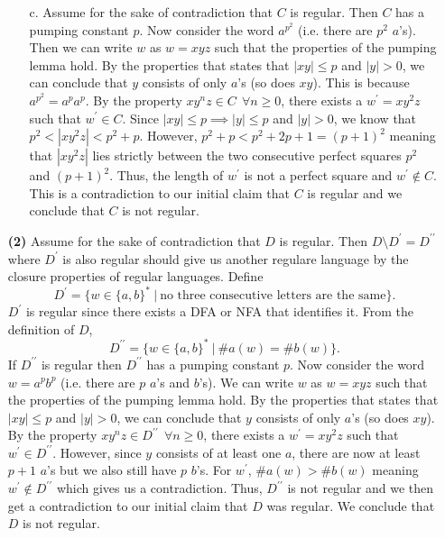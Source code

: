 \documentclass [10pt]{article}
\begin{document}
\begin{enumerate}
\begin{enumerate}
		\item[c.]Assume for the sake of contradiction that $C$ is regular. Then $C$ has a pumping constant $p$. Now consider the word $a^{p^{2}}$ (i.e. there are $p^{2}$ $a$'s). Then we can write $w$ as $w = xyz$ such that the properties of the pumping lemma hold. By the properties that states that $\left|xy\right| \le p$ and $\left|y\right| > 0$, we can conclude that $y$ consists of only $a$'s (so does $xy$). This is because $a^{p^{2}}=a^{p}a^{p}$. By the property $xy^{n}z \in C\:\:\forall n \ge 0$, there exists a $w^{\prime} = xy^{2}z$ such that $w^{\prime} \in C$. Since $\left|xy\right| \le p \implies \left|y\right| \le p$ and $\left|y\right| > 0$, we know that $p^{2} < \left|xy^{2}z\right| < p^{2}+p$. However, $p^{2}+p<p^{2}+2p+1=(p+1)^{2}$ meaning that $\left|xy^{2}z\right|$ lies strictly between the two consecutive perfect squares $p^{2}$ and $(p+1)^{2}$. Thus, the length of $w^{\prime}$ is not a perfect square and $w^{\prime} \notin C$. This is a contradiction to our initial claim that $C$ is regular and we conclude that $C$ is not regular.
	\end{enumerate}
	\item[\textbf{(2)}]Assume for the sake of contradiction that $D$ is regular. Then $D\setminus D^{\prime} = D^{\prime\prime}$ where $D^{\prime}$ is also regular should give us another regulare language by the closure properties of regular languages. Define $$D^{\prime}=\{w\in\{a,b\}^{*}\:|\:\text{no three consecutive letters are the same}\}.$$$D^{\prime}$ is regular since there exists a DFA or NFA that identifies it. From the definition of $D$,$$D^{\prime\prime}=\{w\in\{a,b\}^{*}\:|\:\#a(w)=\#b(w)\}.$$ If $D^{\prime\prime}$ is regular then $D^{\prime\prime}$ has a pumping constant $p$. Now consider the word $w=a^{p}b^{p}$ (i.e. there are $p$ $a$'s and $b$'s). We can write $w$ as $w=xyz$ such that the properties of the pumping lemma hold. By the properties that states that $\left|xy\right| \le p$ and $\left|y\right| > 0$, we can conclude that $y$ consists of only $a$'s (so does $xy$). By the property $xy^{n}z \in D^{\prime\prime}\:\:\forall n \ge 0$, there exists a $w^{\prime} = xy^{2}z$ such that $w^{\prime} \in D^{\prime\prime}$. However, since $y$ consists of at least one $a$, there are now at least $p + 1$ $a$'s but we also still have $p$ $b$'s. For $w^{\prime}$, $\#a(w)>\#b(w)$ meaning $w^{\prime} \notin D^{\prime\prime}$ which gives us a contradiction. Thus, $D^{\prime\prime}$ is not regular and we then get a contradiction to our initial claim that $D$ was regular. We conclude that $D$ is not regular.

\end{enumerate}
\end{document}
